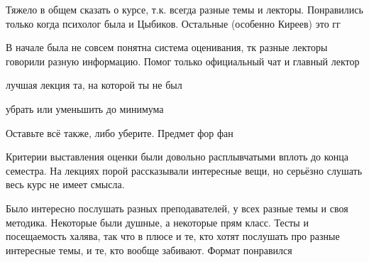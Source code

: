         \begin{commentbox}
            Тяжело в общем сказать о курсе, т.к. всегда разные темы и лекторы. Понравились только когда психолог была и Цыбиков. Остальные (особенно Киреев) это гг
        \end{commentbox}

        \begin{commentbox}
            В начале была не совсем понятна система оценивания, тк разные лекторы говорили разную информацию. Помог только официальный чат и главный лектор
        \end{commentbox}

        \begin{commentbox}
            лучшая лекция та, на которой ты не был
        \end{commentbox}

        \begin{commentbox}
            убрать или уменьшить до минимума 
        \end{commentbox}

        \begin{commentbox}
            Оставьте всё также, либо уберите. Предмет фор фан
        \end{commentbox}

        \begin{commentbox}
            Критерии выставления оценки были довольно расплывчатыми вплоть до конца семестра. На лекциях порой рассказывали интересные вещи, но серьёзно слушать весь курс не имеет смысла.
        \end{commentbox}

        \begin{commentbox}
            Было интересно послушать разных преподавателей, у всех разные темы и своя методика. Некоторые были душные, а некоторые прям класс. Тесты и посещаемость халява, так что в плюсе и те, кто хотят послушать про разные интересные темы, и те, кто вообще забивают. Формат понравился
        \end{commentbox}
